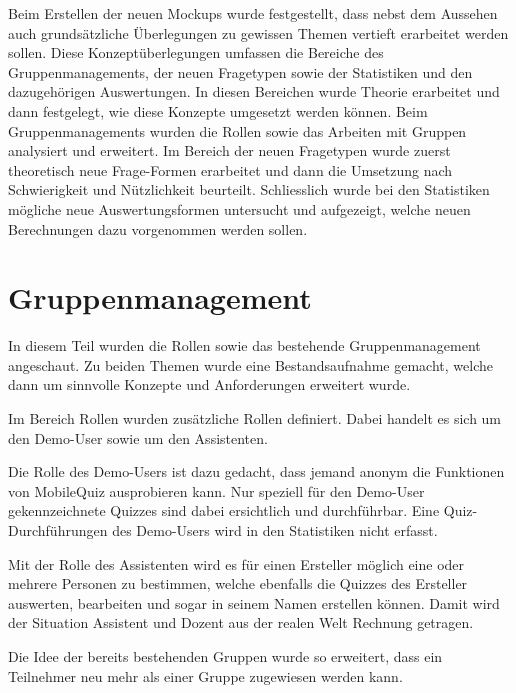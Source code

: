 


Beim Erstellen der neuen Mockups wurde festgestellt, dass nebst dem Aussehen auch grundsätzliche Überlegungen zu gewissen Themen vertieft erarbeitet werden sollen. Diese Konzeptüberlegungen umfassen die Bereiche des Gruppenmanagements, der neuen Fragetypen sowie der Statistiken und den dazugehörigen Auswertungen.
In diesen Bereichen wurde Theorie erarbeitet und dann festgelegt, wie diese Konzepte umgesetzt werden können. Beim Gruppenmanagements wurden die Rollen sowie das Arbeiten mit Gruppen analysiert und erweitert. Im Bereich der neuen Fragetypen wurde zuerst theoretisch neue Frage-Formen erarbeitet und dann die Umsetzung nach Schwierigkeit und Nützlichkeit beurteilt. Schliesslich wurde bei den Statistiken mögliche neue Auswertungsformen untersucht und aufgezeigt, welche neuen Berechnungen dazu vorgenommen werden sollen.

\section{Gruppenmanagement}
In diesem Teil wurden die Rollen sowie das bestehende Gruppenmanagement angeschaut. Zu beiden Themen wurde eine Bestandsaufnahme gemacht, welche dann um sinnvolle Konzepte und Anforderungen erweitert wurde.

\bigskip

Im Bereich Rollen wurden zusätzliche Rollen definiert. Dabei handelt es sich um den Demo-User sowie um den Assistenten.

Die Rolle des Demo-Users ist dazu gedacht, dass jemand anonym die Funktionen von MobileQuiz ausprobieren kann. Nur speziell für den Demo-User gekennzeichnete Quizzes sind dabei ersichtlich und durchführbar. Eine Quiz-Durchführungen des Demo-Users wird in den Statistiken nicht erfasst.

Mit der Rolle des Assistenten wird es für einen Ersteller möglich eine oder mehrere Personen zu bestimmen, welche ebenfalls die Quizzes des Ersteller auswerten, bearbeiten und sogar in seinem Namen erstellen können. Damit wird der Situation Assistent und Dozent aus der realen Welt Rechnung getragen.

\bigskip

Die Idee der bereits bestehenden Gruppen wurde so erweitert, dass ein Teilnehmer neu mehr als einer Gruppe zugewiesen werden kann.


